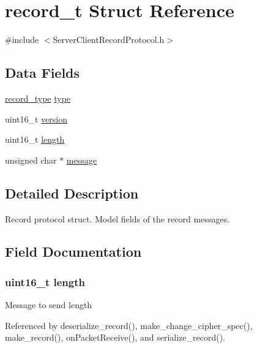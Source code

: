 \hypertarget{structrecord__t}{}\section{record\+\_\+t Struct Reference}
\label{structrecord__t}


{\ttfamily \#include $<$Server\+Client\+Record\+Protocol.\+h$>$}

\subsection*{Data Fields}
\begin{DoxyCompactItemize}
\item 
\hyperlink{_server_client_record_protocol_8h_a393986e23103348f07699f24dcb7f238}{record\+\_\+type} \hyperlink{structrecord__t_ad19c98be8b3445585bee3545c78f6d9c}{type}
\item 
uint16\+\_\+t \hyperlink{structrecord__t_ab6d7b6f8c2ceaba7acda80aaf05f4899}{version}
\item 
uint16\+\_\+t \hyperlink{structrecord__t_a1892eba2086d12ac2b09005aeb09ea3b}{length}
\item 
unsigned char $\ast$ \hyperlink{structrecord__t_abb13456032cf48eaa794391b6ed937c7}{message}
\end{DoxyCompactItemize}


\subsection{Detailed Description}
Record protocol struct. Model fields of the record messages. 

\subsection{Field Documentation}
\subsubsection[{\texorpdfstring{length}{length}}]{\setlength{\rightskip}{0pt plus 5cm}uint16\+\_\+t length}\hypertarget{structrecord__t_a1892eba2086d12ac2b09005aeb09ea3b}{}\label{structrecord__t_a1892eba2086d12ac2b09005aeb09ea3b}
Message to send length 

Referenced by deserialize\+\_\+record(), make\+\_\+change\+\_\+cipher\+\_\+spec(), make\+\_\+record(), on\+Packet\+Receive(), and serialize\+\_\+record().

